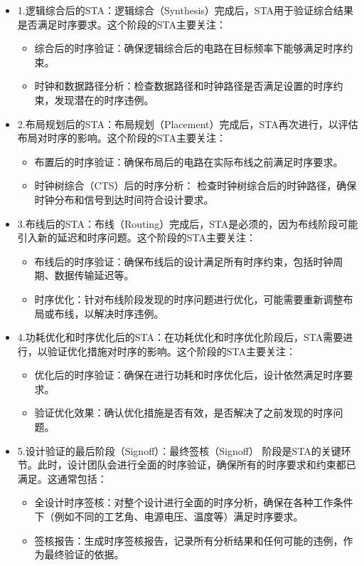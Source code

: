 \begin{itemize}
\item
  1.逻辑综合后的STA：逻辑综合（Synthesis）完成后，STA用于验证综合结果是否满足时序要求。这个阶段的STA主要关注：

  \begin{itemize}
  \tightlist
  \item
    综合后的时序验证：确保逻辑综合后的电路在目标频率下能够满足时序约束。
  \item
    时钟和数据路径分析：检查数据路径和时钟路径是否满足设置的时序约束，发现潜在的时序违例。
  \end{itemize}
\item
  2.布局规划后的STA：布局规划（Placement）完成后，STA再次进行，以评估布局对时序的影响。这个阶段的STA主要关注：

  \begin{itemize}
  \tightlist
  \item
    布置后的时序验证：确保布局后的电路在实际布线之前满足时序要求。
  \item
    时钟树综合（CTS）后的时序分析：
    检查时钟树综合后的时钟路径，确保时钟分布和信号到达时间符合设计要求。
  \end{itemize}
\item
  3.布线后的STA：布线（Routing）完成后，STA是必须的，因为布线阶段可能引入新的延迟和时序问题。这个阶段的STA主要关注：

  \begin{itemize}
  \tightlist
  \item
    布线后的时序验证：确保布线后的设计满足所有时序约束，包括时钟周期、数据传输延迟等。
  \item
    时序优化：针对布线阶段发现的时序问题进行优化，可能需要重新调整布局或布线，以解决时序违例。
  \end{itemize}
\item
  4.功耗优化和时序优化后的STA：在功耗优化和时序优化阶段后，STA需要进行，以验证优化措施对时序的影响。这个阶段的STA主要关注：

  \begin{itemize}
  \tightlist
  \item
    优化后的时序验证：确保在进行功耗和时序优化后，设计依然满足时序要求。
  \item
    验证优化效果：确认优化措施是否有效，是否解决了之前发现的时序问题。
  \end{itemize}
\item
  5.设计验证的最后阶段（Signoff）：最终签核（Signoff）
  阶段是STA的关键环节。此时，设计团队会进行全面的时序验证，确保所有的时序要求和约束都已满足。这通常包括：

  \begin{itemize}
  \tightlist
  \item
    全设计时序签核：对整个设计进行全面的时序分析，确保在各种工作条件下（例如不同的工艺角、电源电压、温度等）满足时序要求。
  \item
    签核报告：生成时序签核报告，记录所有分析结果和任何可能的违例，作为最终验证的依据。
  \end{itemize}
\end{itemize}

